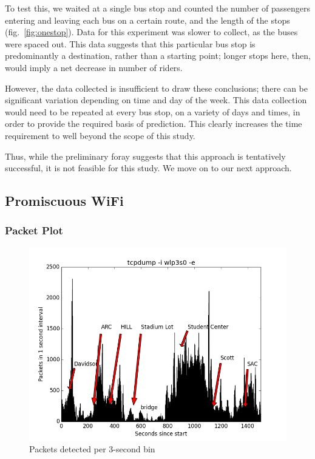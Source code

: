 \documentclass[11pt,journal,compsoc]{IEEEtran} %
\begin{document}
	To test this, we waited at a single bus stop and counted the number of passengers entering and leaving each bus on a certain route, and the length of the stops (fig.~\ref{fig:onestop}).
	Data for this experiment was slower to collect, as the buses were spaced out.
	This data suggests that this particular bus stop is predominantly a destination, rather than a starting point; longer stops here, then, would imply a net decrease in number of riders.
    
	However, the data collected is insufficient to draw these conclusions; there can be significant variation depending on time and day of the week.
	This data collection would need to be repeated at every bus stop, on a variety of days and times, in order to provide the required basis of prediction.
	This clearly increases the time requirement to well beyond the scope of this study.
	
	Thus, while the preliminary foray suggests that this approach is tentatively successful, it is not feasible for this study.
	We move on to our next approach.

\subsection*{Promiscuous WiFi}
    
	\subsubsection*{Packet Plot}
		\begin{figure}[!t]
		  \includegraphics[width=\textwidth]{packets}
          \caption{Packets detected per 3-second bin}
          \label{fig:buspackets}
		\end{figure}
\end{document}
